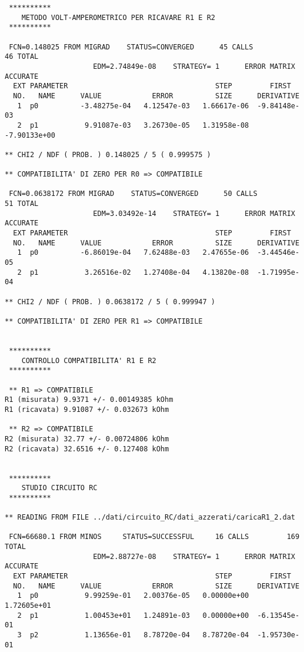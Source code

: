 \begin{verbatim}
 **********
    METODO VOLT-AMPEROMETRICO PER RICAVARE R1 E R2
 **********

 FCN=0.148025 FROM MIGRAD    STATUS=CONVERGED      45 CALLS          46 TOTAL
                     EDM=2.74849e-08    STRATEGY= 1      ERROR MATRIX ACCURATE 
  EXT PARAMETER                                   STEP         FIRST   
  NO.   NAME      VALUE            ERROR          SIZE      DERIVATIVE 
   1  p0          -3.48275e-04   4.12547e-03   1.66617e-06  -9.84148e-03
   2  p1           9.91087e-03   3.26730e-05   1.31958e-08  -7.90133e+00

** CHI2 / NDF ( PROB. ) 0.148025 / 5 ( 0.999575 )

** COMPATIBILITA' DI ZERO PER R0 => COMPATIBILE

 FCN=0.0638172 FROM MIGRAD    STATUS=CONVERGED      50 CALLS          51 TOTAL
                     EDM=3.03492e-14    STRATEGY= 1      ERROR MATRIX ACCURATE 
  EXT PARAMETER                                   STEP         FIRST   
  NO.   NAME      VALUE            ERROR          SIZE      DERIVATIVE 
   1  p0          -6.86019e-04   7.62488e-03   2.47655e-06  -3.44546e-05
   2  p1           3.26516e-02   1.27408e-04   4.13820e-08  -1.71995e-04

** CHI2 / NDF ( PROB. ) 0.0638172 / 5 ( 0.999947 )

** COMPATIBILITA' DI ZERO PER R1 => COMPATIBILE


 **********
    CONTROLLO COMPATIBILITA' R1 E R2
 **********

 ** R1 => COMPATIBILE
R1 (misurata) 9.9371 +/- 0.00149385 kOhm
R1 (ricavata) 9.91087 +/- 0.032673 kOhm

 ** R2 => COMPATIBILE
R2 (misurata) 32.77 +/- 0.00724806 kOhm
R2 (ricavata) 32.6516 +/- 0.127408 kOhm


 **********
    STUDIO CIRCUITO RC
 **********

** READING FROM FILE ../dati/circuito_RC/dati_azzerati/caricaR1_2.dat

 FCN=66680.1 FROM MINOS     STATUS=SUCCESSFUL     16 CALLS         169 TOTAL
                     EDM=2.88727e-08    STRATEGY= 1      ERROR MATRIX ACCURATE 
  EXT PARAMETER                                   STEP         FIRST   
  NO.   NAME      VALUE            ERROR          SIZE      DERIVATIVE 
   1  p0           9.99259e-01   2.00376e-05   0.00000e+00   1.72605e+01
   2  p1           1.00453e+01   1.24891e-03   0.00000e+00  -6.13545e-01
   3  p2           1.13656e-01   8.78720e-04   8.78720e-04  -1.95730e-01


\end{verbatim}
